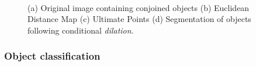 \begin{figure}[tb]
	\centering
	\hspace{1cm}
	\\
	\hspace{1cm}
  \caption{(a) Original image containing conjoined objects (b) Euclidean Distance Map (c) Ultimate Points (d) Segmentation of objects following conditional \emph{dilation}.}
  \label{fig:WatershedSeg}
\end{figure}

\subsubsection{Object classification}


